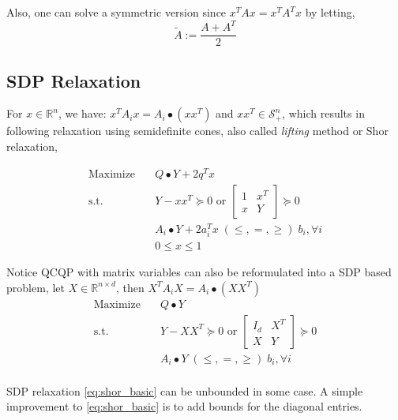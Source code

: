 \documentclass[../main]{subfiles}
\begin{document}
Also, one can solve a symmetric version since \(x^TAx = x^TA^Tx\) by letting,
\begin{equation}
  \tilde A := \frac{A+A^T}{2}
\end{equation}

\subsection{SDP Relaxation}
For \(x \in \mathbb{R}^{n}\), we have: \(x^{T} A_{i} x = A_i \bullet (xx^T)\) and \(xx^T \in \mathcal{S}^n_{+}\), which results in following relaxation using semidefinite cones, also called \textit{lifting} method or Shor relaxation,

\begin{equation}\label{eq:shor_basic}
  \begin{aligned}
    \mathrm{Maximize}\quad & Q\bullet Y   + 2q^T x                                            \\
    \mathrm{s.t.}  \quad   & Y-xx^T \succeq 0 \text { or }\begin{bmatrix} 1 & x^{T} \\ x & Y \end{bmatrix} \succeq 0 \\
                           & A_i \bullet Y +2 a_i^Tx \; (\le, =, \ge) \; b_i, \forall i       \\
                           & 0\le x\le 1
  \end{aligned}
\end{equation}

Notice QCQP with matrix variables can also be reformulated into a SDP based problem, let \(X \in \mathbb{R}^{n\times d}\), then \(X^{T} A_{i} X = A_i \bullet (XX^T)\)
\begin{equation}
  \begin{aligned}
    \mathrm{Maximize}\quad & Q\bullet Y                                                       \\
    \mathrm{s.t.}  \quad   & Y-XX^T \succeq 0 \text { or }\begin{bmatrix} I_d & X^{T} \\ X & Y \end{bmatrix} \succeq 0 \\
                           & A_i \bullet Y \; (\le, =, \ge) \; b_i, \forall i                 \\
  \end{aligned}
\end{equation}

SDP relaxation \eqref{eq:shor_basic} can be unbounded in some case. A simple improvement to \eqref{eq:shor_basic} is to add bounds for the diagonal entries.
\end{document}
